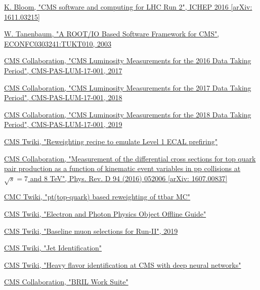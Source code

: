 \documentclass[a4paper, 10pt, openright]{report}
\begin{document}
\begin{thebibliography}{1}
\href{https://arxiv.org/abs/1611.03215}{K. Bloom,
"CMS software and computing for LHC Run 2",
ICHEP 2016 [arXiv: 1611.03215]}

\href{https://arxiv.org/abs/cs/0306034}{W. Tanenbaum,
"A ROOT/IO Based Software Framework for CMS",
ECONFC0303241:TUKT010, 2003}

\href{https://cds.cern.ch/record/2257069}{CMS Collaboration,
"CMS Luminosity Measurements for the 2016 Data Taking Period",
CMS-PAS-LUM-17-001, 2017}

\href{http://inspirehep.net/record/1677076}{CMS Collaboration,
"CMS Luminosity Measurements for the 2017 Data Taking Period",
CMS-PAS-LUM-17-001, 2018}

\href{http://inspirehep.net/record/1736713/}{CMS Collaboration,
"CMS Luminosity Measurements for the 2018 Data Taking Period",
CMS-PAS-LUM-17-001, 2019}

\href{https://twiki.cern.ch/twiki/bin/view/CMS/L1ECALPrefiringWeightRecipe}{\ac{CMS} Twiki,
"Reweighting recipe to emulate Level 1 ECAL prefiring"}

\href{https://arxiv.org/abs/1607.00837}{CMS Collaboration,
"Measurement of the differential cross sections for top quark pair production as a function of kinematic event variables in pp collisions at $\sqrt{s} = 7$ and 8 TeV",
Phys. Rev. D 94 (2016) 052006 [arXiv: 1607.00837]}

\href{https://twiki.cern.ch/twiki/bin/viewauth/CMS/TopPtReweighting}{\ac{CMC} Twiki,
"pt(top-quark) based reweighting of ttbar MC"}

\href{https://twiki.cern.ch/twiki/bin/view/CMSPublic/SWGuideEgamma}{\ac{CMS} Twiki,
"Electron and Photon Physics Object Offline Guide"}

\href{https://twiki.cern.ch/twiki/bin/viewauth/CMS/SWGuideMuonIdRun2}{\ac{CMS} Twiki,
"Baseline muon selections for Run-II", 2019}

\href{https://twiki.cern.ch/twiki/bin/view/CMS/JetID}{\ac{CMS} Twiki,
"Jet Identification"}

\href{https://twiki.cern.ch/twiki/bin/view/CMSPublic/BTV13TeVDPDeepCSV}{\ac{CMS} Twiki,
"Heavy flavor identification at CMS with deep neural networks"}


\href{https://cms-service-lumi.web.cern.ch/cms-service-lumi/brilwsdoc.html}{CMS Collaboration,
"BRIL Work Suite"}

\end{thebibliography}
\end{document}
